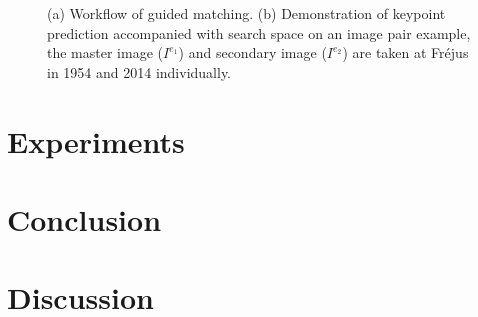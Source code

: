 \begin{figure}[htbp]
	\begin{center}
		\caption{(a) Workflow of guided matching. (b) Demonstration of keypoint prediction accompanied with search space on an image pair example, the master image ($I^{e_1}$) and secondary image ($I^{e_2}$) are taken at Fr{\'e}jus in 1954 and 2014 individually.}
		\label{WorkflowPatch}
	\end{center}
\end{figure}



\section{Experiments}

\section{Conclusion}

\section{Discussion}
